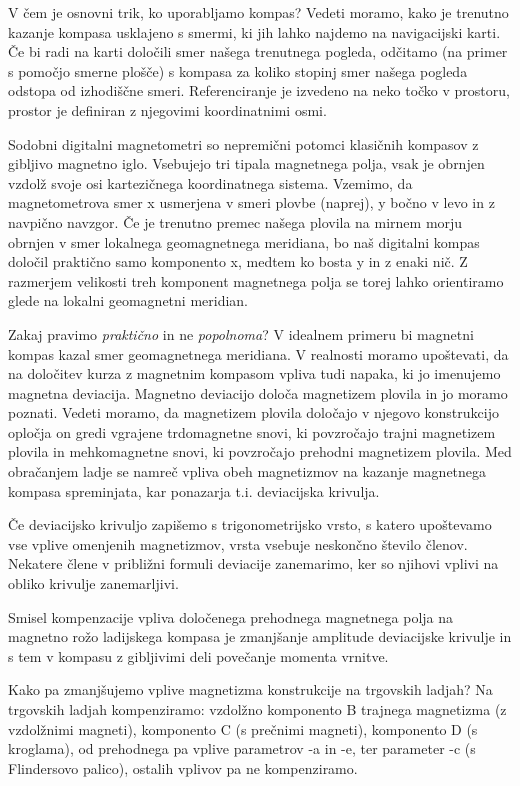 
V čem je osnovni trik, ko uporabljamo kompas? Vedeti moramo, kako je trenutno kazanje kompasa usklajeno s smermi, ki jih lahko najdemo na navigacijski karti. Če bi radi na karti določili smer našega trenutnega pogleda, odčitamo (na primer s pomočjo smerne plošče) s kompasa za koliko stopinj smer našega pogleda odstopa od izhodiščne smeri. Referenciranje je izvedeno na neko točko v prostoru, prostor je definiran z njegovimi koordinatnimi osmi.

Sodobni digitalni magnetometri so nepremični potomci klasičnih kompasov z gibljivo magnetno iglo. Vsebujejo tri tipala magnetnega polja, vsak je obrnjen vzdolž svoje osi kartezičnega koordinatnega sistema. Vzemimo, da magnetometrova smer x usmerjena v smeri plovbe (naprej), y bočno v levo in z navpično navzgor. Če je trenutno premec našega plovila na mirnem morju obrnjen v smer lokalnega geomagnetnega meridiana, bo naš digitalni kompas določil praktično samo komponento x, medtem ko bosta y in z enaki nič. Z razmerjem velikosti treh komponent magnetnega polja se torej lahko orientiramo glede na lokalni geomagnetni meridian. 

Zakaj pravimo \textit{praktično} in ne \textit{popolnoma}? V idealnem primeru bi magnetni kompas kazal smer geomagnetnega meridiana. V realnosti moramo upoštevati, da na določitev kurza z magnetnim kompasom vpliva tudi napaka, ki jo imenujemo magnetna deviacija. Magnetno deviacijo določa magnetizem plovila in jo moramo poznati. Vedeti moramo, da magnetizem plovila določajo v njegovo konstrukcijo opločja on gredi vgrajene trdomagnetne snovi, ki povzročajo trajni magnetizem plovila in mehkomagnetne snovi, ki povzročajo prehodni magnetizem plovila. Med obračanjem ladje se namreč vpliva obeh magnetizmov na kazanje magnetnega kompasa spreminjata, kar ponazarja t.i. deviacijska krivulja.

Če deviacijsko krivuljo zapišemo s trigonometrijsko vrsto, s katero upoštevamo vse vplive omenjenih magnetizmov, vrsta vsebuje neskončno število členov. Nekatere člene v približni formuli deviacije zanemarimo, ker so njihovi vplivi na obliko krivulje zanemarljivi.

Smisel kompenzacije vpliva določenega prehodnega magnetnega polja na magnetno rožo ladijskega kompasa je zmanjšanje amplitude deviacijske krivulje in s tem v kompasu z gibljivimi deli povečanje momenta vrnitve.

Kako pa zmanjšujemo vplive magnetizma konstrukcije na trgovskih ladjah? Na trgovskih ladjah kompenziramo: vzdolžno komponento B trajnega magnetizma (z vzdolžnimi magneti), komponento C (s prečnimi magneti), komponento D (s kroglama), od prehodnega pa vplive parametrov -a in -e, ter parameter -c (s Flindersovo palico), ostalih vplivov pa ne kompenziramo.

